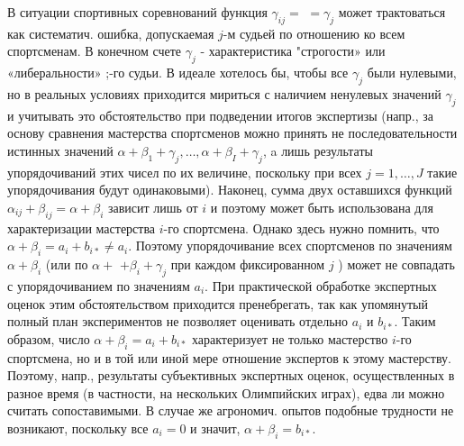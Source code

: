 \documentclass[10pt]{article}
\begin{document}
В ситуации спортивных соревнований функция $\gamma_{i j}=$ $=\gamma_{j}$ может трактоваться как систематич. ошибка, допускаемая $j$-м судьей по отношению ко всем спортсменам. В конечном счете $\gamma_{j}$ - характеристика "строгости» или «либеральности» ;-го судьи. В идеале хотелось бы, чтобы все $\gamma_{j}$ были нулевыми, но в реальных условиях приходится мириться с наличием ненулевых значений $\gamma_{j}$ и учитывать это обстоятельство при подведении итогов экспертизы (напр., за основу сравнения мастерства спортсменов можно принять не последовательности истинных значений $\alpha+\beta_{1}+\gamma_{j}, \ldots, \alpha+\beta_{I}+\gamma_{j}$, a лишь результаты упорядочиваний этих чисел по их величине, поскольку при всех $j=1, \ldots, J$ такие упорядочивания будут одинаковыми). Наконец, сумма двух оставшихся функций $\alpha_{i j}+\beta_{i j}=\alpha+\beta_{i}$ зависит лишь от $i$ и поэтому может быть использована для характеризации мастерства $i$-го спортсмена. Однако здесь нужно помнить, что $\alpha+\beta_{i}=a_{i}+b_{i *} \neq a_{i}$. Поэтому упорядочивание всех спортсменов по значениям $\alpha+\beta_{i}$ (или по $\alpha+$ $+\beta_{i}+\gamma_{j}$ при каждом фиксированном $j$ ) может не совпадать с упорядочиванием по значениям $a_{i}$. При практической обработке экспертных оценок этим обстоятельством приходится пренебрегать, так как упомянутый полный план экспериментов не позволяет оценивать отдельно $a_{i}$ и $b_{i *}$. Таким образом, число $\alpha+\beta_{i}=a_{i}+b_{i *}$ характеризует не только мастерство $i$-го спортсмена, но и в той или иной мере отношение экспертов к этому мастерству. Поэтому, напр., результаты субъективных экспертных оценок, осуществленных в разное время (в частности, на нескольких Олимпийских играх), едва ли можно считать сопоставимыми. В случае же агрономич. опытов подобные трудности не возникают, поскольку все $a_{i}=0$ и значит, $\alpha+\beta_{i}=b_{i *}$.
\end{document}
